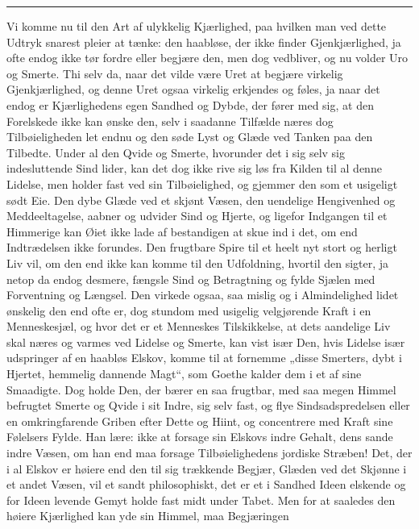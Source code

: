 \documentclass[12pt,a4paper]{book}
\newcommand{\apage}[1]{\marginnote{\footnotesize\textit{[#1]}}}
\begin{document}
\begin{center}\rule{0.28\linewidth}{0.4pt}\end{center} \apage{157}

Vi komme nu til den Art af ulykkelig Kjærlighed, paa hvilken man ved
dette Udtryk snarest pleier at tænke: den haabløse, der ikke finder
Gjenkjærlighed, ja ofte endog ikke tør fordre eller begjære den, men dog
vedbliver, og nu volder Uro og Smerte. Thi selv da, naar det vilde være
Uret at begjære virkelig Gjenkjærlighed, og denne Uret ogsaa virkelig
erkjendes og føles, ja naar det endog er Kjærlighedens egen Sandhed og
Dybde, der fører med sig, at den Forelskede ikke kan ønske den, selv i
saadanne Tilfælde næres dog Tilbøieligheden let endnu og den søde Lyst og
Glæde ved Tanken paa den Tilbedte. Under al den Qvide og Smerte,
hvorunder det i sig selv sig indesluttende Sind lider, kan det dog ikke
rive sig løs fra Kilden til al denne Lidelse, men holder fast ved sin
Tilbøielighed, og gjemmer den som et usigeligt sødt Eie. Den dybe Glæde
ved et skjønt Væsen, den uendelige Hengivenhed og Meddeeltagelse, aabner
og udvider Sind og Hjerte, og ligefor Indgangen til et Himmerige kan Øiet
ikke lade af bestandigen at skue ind i det, om end Indtrædelsen ikke
forundes. Den frugtbare Spire til et heelt nyt stort og herligt Liv vil,
om den end ikke kan komme til den Udfoldning, hvortil den sigter, ja
netop da endog desmere, fængsle Sind og Betragtning og fylde Sjælen med
Forventning og Længsel. Den virkede ogsaa, saa mislig og i Almindelighed
lidet ønskelig den end ofte er, dog stundom med usigelig velgjørende
Kraft i en Menneskesjæl, og hvor det er et Menneskes Tilskikkelse, \apage{158} at
dets aandelige Liv skal næres og varmes ved Lidelse og Smerte, kan vist
især Den, hvis Lidelse især udspringer af en haabløs Elskov, komme til at
fornemme „disse Smerters, dybt i Hjertet, hemmelig dannende Magt“, som
Goethe kalder dem i et af sine Smaadigte. Dog holde Den, der bærer en saa
frugtbar, med saa megen Himmel befrugtet Smerte og Qvide i sit Indre, sig
selv fast, og flye Sindsadspredelsen eller en omkringfarende Griben efter
Dette og Hiint, og concentrere med Kraft sine Følelsers Fylde. Han lære:
ikke at forsage sin Elskovs indre Gehalt, dens sande indre Væsen, om han
end maa forsage Tilbøielighedens jordiske Stræben! Det, der i al Elskov
er høiere end den til sig trækkende Begjær, Glæden ved det Skjønne i et
andet Væsen, vil et sandt philosophiskt, det er et i Sandhed Ideen
elskende og for Ideen levende Gemyt holde fast midt under Tabet. Men for
at saaledes den høiere Kjærlighed kan yde sin Himmel, maa Begjæringen
\end{document}

